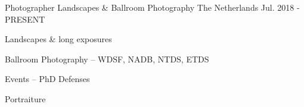\begin{cventries}
    \cventry
      {Photographer} %
      {Landscapes \& Ballroom Photography} %
      {The Netherlands} %
      {Jul. 2018 - PRESENT} %
      {
        \begin{cvitems}
          \item Landscapes \& long exposures
          \item Ballroom Photography -- WDSF, NADB, NTDS, ETDS
          \item Events -- PhD Defenses
          \item Portraiture
        \end{cvitems}
      }
\end{cventries}
